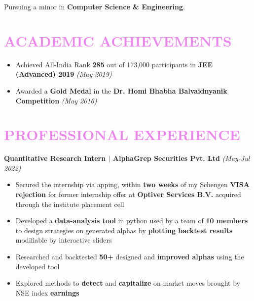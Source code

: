 \documentclass[a4paper,11pt]{article}
\begin{document}
\vspace*{36mm}

Pursuing a minor in \textbf{Computer Science \& Engineering}.
\vspace{-4.5mm}

\section{\textcolor{Violet}{\textbf{\Large{A}\large{CADEMIC} \Large{A}\large{CHIEVEMENTS}}}}
\vspace{-7.5pt}
\begin{itemize}[noitemsep]
    \item Achieved All-India Rank \textbf{285} out of 173,000 participants in \textbf{JEE (Advanced) 2019} \hfill \emph{(May 2019)}
    \item Awarded a \textbf{Gold Medal} in the \textbf{Dr. Homi Bhabha Balvaidnyanik Competition} \hfill \emph{(May 2016)}
\end{itemize}
\vspace{-8mm}

\section{\textcolor{Violet}{\textbf{\Large{P}\large{ROFESSIONAL} \Large{E}\large{XPERIENCE}}}}
\vspace{-7.5pt}

\textbf{Quantitative Research Intern $\mid$ AlphaGrep Securities Pvt. Ltd} \hfill \emph{(May-Jul 2022)}
\vspace{-7.5pt}
\begin{itemize}[noitemsep]
    \item Secured the internship via apping, within \textbf{two weeks} of my Schengen \textbf{VISA rejection} for former internship offer at \textbf{Optiver Services B.V.} acquired through the institute placement cell
    \item Developed a \textbf{data-analysis tool} in python used by a team of \textbf{10 members} to design strategies on generated alphas by \textbf{plotting backtest results} modifiable by interactive sliders
    \item Researched and backtested \textbf{50+} designed and \textbf{improved alphas} using the developed tool 
    \item Explored methods to \textbf{detect} and \textbf{capitalize} on market moves brought by NSE index \textbf{earnings}
\end{itemize}
\vspace{-4.5pt}
\end{document}

